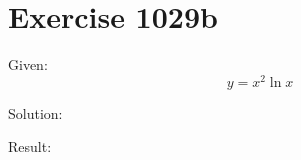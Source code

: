 \documentclass[a4paper, 10pt]{scrartcl}
\begin{document}
\section{Exercise 1029b}

Given:
\[
y = x^{2}\ln{x}
\]

Solution:

Result:
\end{document}
